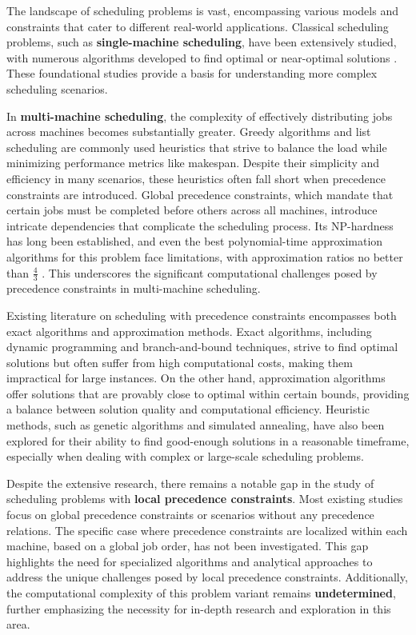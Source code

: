 The landscape of scheduling problems is vast, encompassing various models and constraints that cater to different real-world applications. Classical scheduling problems, such as \textbf{single-machine scheduling}, have been extensively studied, with numerous algorithms developed to find optimal or near-optimal solutions \cite{ChekuriMotwani:99:Precedence-constrained}. These foundational studies provide a basis for understanding more complex scheduling scenarios.

In \textbf{multi-machine scheduling}, the complexity of effectively distributing jobs across machines becomes substantially greater. Greedy algorithms and list scheduling are commonly used heuristics that strive to balance the load while minimizing performance metrics like makespan. Despite their simplicity and efficiency in many scenarios, these heuristics often fall short when precedence constraints are introduced. Global precedence constraints, which mandate that certain jobs must be completed before others across all machines, introduce intricate dependencies that complicate the scheduling process. Its NP-hardness has long been established, and even the best polynomial-time approximation algorithms for this problem face limitations, with approximation ratios no better than $\frac{4}{3}$ \cite{LenstraRinnooy-Kan:78:Complexity-of-scheduling}. This underscores the significant computational challenges posed by precedence constraints in multi-machine scheduling.

Existing literature on scheduling with precedence constraints encompasses both exact algorithms and approximation methods. Exact algorithms, including dynamic programming and branch-and-bound techniques, strive to find optimal solutions but often suffer from high computational costs, making them impractical for large instances. On the other hand, approximation algorithms offer solutions that are provably close to optimal within certain bounds, providing a balance between solution quality and computational efficiency. Heuristic methods, such as genetic algorithms and simulated annealing, have also been explored for their ability to find good-enough solutions in a reasonable timeframe, especially when dealing with complex or large-scale scheduling problems.

Despite the extensive research, there remains a notable gap in the study of scheduling problems with \textbf{local precedence constraints}. Most existing studies focus on global precedence constraints or scenarios without any precedence relations. The specific case where precedence constraints are localized within each machine, based on a global job order, has not been investigated. This gap highlights the need for specialized algorithms and analytical approaches to address the unique challenges posed by local precedence constraints. Additionally, the computational complexity of this problem variant remains \textbf{undetermined}, further emphasizing the necessity for in-depth research and exploration in this area.

